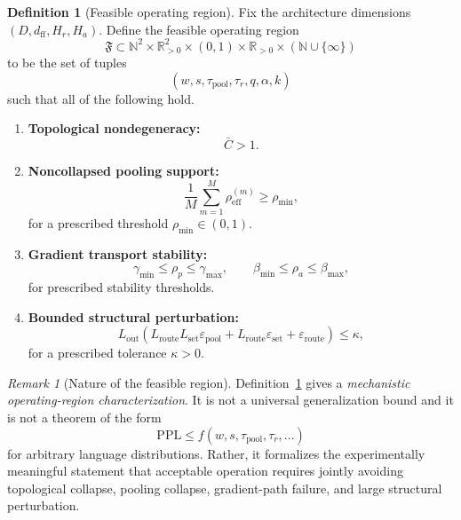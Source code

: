 \documentclass{article}
\theoremstyle{plain}
\theoremstyle{definition}
\newtheorem{definition}[theorem]{Definition}
\theoremstyle{remark}
\newtheorem{remark}[theorem]{Remark}
\begin{document}
\begin{definition}[Feasible operating region]
\label{def:feasible-operating-region}
Fix the architecture dimensions $(D,d_{\mathrm{ff}},H_r,H_a)$. Define the feasible operating region
\[
\mathfrak{F}
\subset
\mathbb{N}^2 \times \mathbb{R}_{>0}^2 \times (0,1)\times \mathbb{R}_{>0}\times (\mathbb{N}\cup\{\infty\})
\]
to be the set of tuples
\[
(w,s,\tau_{\mathrm{pool}},\tau_r,q,\alpha,k)
\]
such that all of the following hold.

\begin{enumerate}
    \item \textbf{Topological nondegeneracy:}
    \begin{equation}
    \label{eq:feasible-topology-cond}
    \bar{C}>1.
    \end{equation}

    \item \textbf{Noncollapsed pooling support:}
    \begin{equation}
    \label{eq:feasible-pooling-cond}
    \frac{1}{M}\sum_{m=1}^{M}\rho_{\mathrm{eff}}^{(m)}
    \ge \rho_{\min},
    \end{equation}
    for a prescribed threshold $\rho_{\min}\in (0,1)$.

    \item \textbf{Gradient transport stability:}
    \begin{equation}
    \label{eq:feasible-gradient-cond1}
    \gamma_{\min}\le \rho_p \le \gamma_{\max},
    \qquad
    \beta_{\min}\le \rho_a \le \beta_{\max},
    \end{equation}
    for prescribed stability thresholds.

    \item \textbf{Bounded structural perturbation:}
    \begin{equation}
    \label{eq:feasible-loss-cond}
    L_{\mathrm{out}}
    \left(
    L_{\mathrm{route}}L_{\mathrm{set}}\varepsilon_{\mathrm{pool}}
    +
    L_{\mathrm{route}}\varepsilon_{\mathrm{set}}
    +
    \varepsilon_{\mathrm{route}}
    \right)
    \le \kappa,
    \end{equation}
    for a prescribed tolerance $\kappa>0$.
\end{enumerate}
\end{definition}

\begin{remark}[Nature of the feasible region]
\label{rem:feasible-region-not-generalization}
Definition~\ref{def:feasible-operating-region} gives a \emph{mechanistic operating-region characterization}. It is not a universal generalization bound and it is not a theorem of the form
\[
\mathrm{PPL} \le f(w,s,\tau_{\mathrm{pool}},\tau_r,\dots)
\]
for arbitrary language distributions. Rather, it formalizes the experimentally meaningful statement that acceptable operation requires jointly avoiding topological collapse, pooling collapse, gradient-path failure, and large structural perturbation.
\end{remark}
\end{document}
